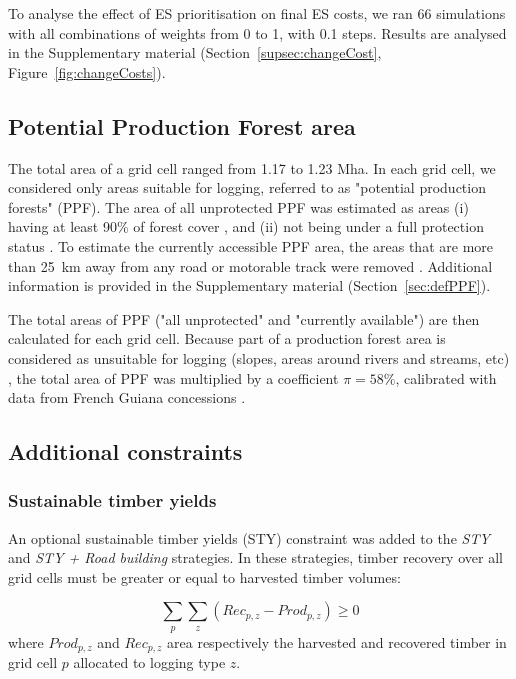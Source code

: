\documentclass{article}
\begin{document}
To analyse the effect of ES prioritisation on final ES costs, we ran 66 simulations with all combinations of weights from 0 to 1, with 0.1 steps. Results are analysed in the Supplementary material (Section~\ref{supsec:changeCost}, Figure~\ref{fig:changeCosts}).  

\subsection{Potential Production Forest area}
\label{sec:ppf}

The total area of a grid cell ranged from 1.17 to 1.23 Mha. In each grid cell, we considered only areas suitable for logging, referred to as "potential production forests" (PPF). The area of all unprotected PPF was estimated as areas (i) having at least 90\% of forest cover \cite{Hansen2013}, and (ii) not being under a full protection status \cite{WDPA2016}. To estimate the currently accessible PPF area, the areas that are more than 25~km away from any road or motorable track were removed \cite{OSM2018}. Additional information is provided in the Supplementary material (Section~\ref{sec:defPPF}). 

The total areas of PPF ("all unprotected" and "currently available") are then calculated for each grid cell. Because part of a production forest area is considered as unsuitable for logging (slopes, areas around rivers and streams, etc) \cite{Verissimo2006}, the total area of PPF was multiplied by a coefficient $\pi = 58\%$, calibrated with data from French Guiana concessions \cite{Piponiotc}. 

\subsection{Additional constraints}

\subsubsection{Sustainable timber yields}

An optional sustainable timber yields (STY) constraint was added to the \textit{STY} and \textit{STY + Road building} strategies. In these strategies, timber recovery over all grid cells must be greater or equal to harvested timber volumes: 

\begin{equation}
    \sum_{p}\sum_{z} (Rec_{p,z} - Prod_{p,z}) \geq 0 
\end{equation}
where $Prod_{p,z}$ and $Rec_{p,z}$ area respectively the harvested and recovered timber in grid cell $p$ allocated to logging type $z$.
\end{document}
